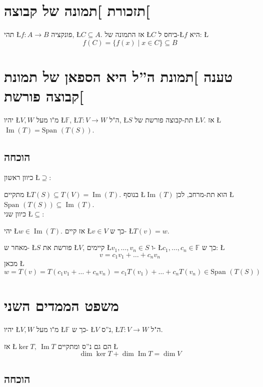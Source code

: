 \documentclass[english,hebrew]{article}
\newcommand{\spn}{\text{Span }}
\begin{document}
\section{תזכורת {]}תמונה של קבוצה{[}}

תהי \L{$f:A\to B$} פונקציה, \L{$C\subseteq A$}. אז התמונה של \L{$C$}
ביחס ל-\L{$f$} היא: \L{%
\[
f(C)=\{f(x)\mid x\in C\}\subseteq B
\]
}%

\section{טענה {]}תמונת ה\textquotedblright ל היא הספאן של תמונת קבוצה פורשת{[}}

יהיו \L{$V,W$} מ"ו מעל \L{$\mathbb{F}$}, \L{$T:V\to W$} ה"ל,
\L{$S$} תת-קבוצה פורשת של \L{$V$}. אז \L{$\operatorname{Im}(T)=\spn(T(S))$}.

\subsection{הוכחה}

כיוון ראשון \L{$\supseteq$}:

מתקיים \L{$T(S)\subseteq T(V)=\operatorname{Im}(T)$}. בנוסף \L{$\operatorname{Im}(T)$}
הוא תת-מרחב, לכן \L{$\spn(T(S))\subseteq\operatorname{Im}(T)$}.\\

כיוון שני \L{$\subseteq$}:

יהי \L{$w\in\operatorname{Im}(T)$}. אז קיים \L{$v\in V$} כך ש- \L{$T(v)=w$}.

מאחר ש- \L{$S$} פורשת את \L{$V$}, קיימים \L{$v_{1},\dots,v_{n}\in S$}
ו- \L{$c_{1},\dots,c_{n}\in\mathbb{F}$} כך ש: \L{%
\[
v=c_{1}v_{1}+\dots+c_{n}v_{n}
\]
}%
מכאן \L{%
\[
w=T(v)=T(c_{1}v_{1}+\dots+c_{n}v_{n})=c_{1}T(v_{1})+\dots+c_{n}T(v_{n})\in\spn(T(S))
\]
}%

\section{משפט הממדים השני}

יהיו \L{$V,W$} מ"ו מעל \L{$\mathbb{F}$} כך ש- \L{$V$} נ\textquotedblright ס,
\L{$T:V\to W$} ה"ל.

אז \L{$\ker T,\ \operatorname{Im}T$} הם גם נ\textquotedblright ס
ומתקיים \L{%
\[
\dim\ker T+\dim\operatorname{Im}T=\dim V
\]
}%

\subsection{הוכחה}
\end{document}

